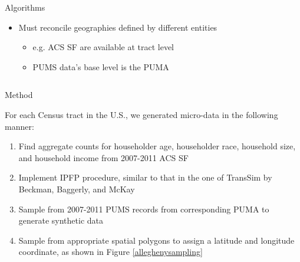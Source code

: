 \documentclass[final, 14pt]{beamer}
\newlength{\onecolwid}
\newlength{\twocolwid}
\begin{document}
\begin{frame}[t]
\begin{columns}[t]
\begin{column}{\twocolwid}
\begin{columns}[t,totalwidth=\twocolwid]
\begin{column}{\onecolwid}

\begin{block}{Algorithms }
\begin{itemize}
\item Must reconcile geographies defined by different entities
\begin{itemize}
\item e.g. ACS SF are available at tract level
\item PUMS data's base level is the PUMA
\end{itemize}
\end{itemize}
\end{block}


\end{column} %

\end{columns} %



\begin{columns}[t,totalwidth=\twocolwid] %

\begin{column}{\onecolwid} %


\begin{block}{Method}

For each Census tract in the U.S., we generated micro-data in the following manner:
  
\begin{enumerate}
\item Find aggregate counts for householder age, householder race, household size, and household income from 2007-2011 ACS SF
\item Implement IPFP procedure, similar to that in the one of TransSim by Beckman, Baggerly, and McKay \cite{beckman.baggerly.mckay96}
\item Sample from 2007-2011  PUMS records from corresponding PUMA to generate synthetic data
\item Sample from appropriate spatial polygons to assign a latitude and longitude coordinate, as shown in Figure \ref{alleghenysampling}


\end{enumerate}
\end{block}
\end{column}
\end{columns}
\end{column}
\end{columns}
\end{frame}
\end{document}
